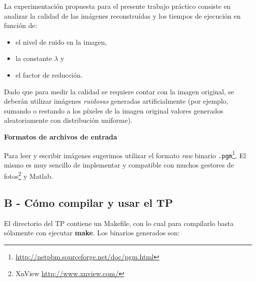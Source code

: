 \documentclass[a4paper]{article}
\begin{document}
La experimentaci\'on propuesta para el presente trabajo pr\'actico consiste en analizar la calidad de las im\'agenes reconstru\'idas y los tiempos de ejecuci\'on en funci\'on de: \\[-8mm]
	\begin{itemize}
		\item el nivel de ruido en la imagen, \\[-6mm]
		\item la constante $\lambda$ y\\[-6mm]
		\item el factor de reducci\'on. \\[-6mm]
	\end{itemize}	
	
Dado que para medir la calidad se requiere contar con la imagen original, se deber\'an utilizar im\'agenes \emph{ruidosas} generadas artificialmente (por ejemplo, sumando o restando a los p\'ixeles de la imagen original valores generados aleatoriamente con distribuci\'on uniforme).
	
{\bf Formatos de archivos de entrada}

Para leer y escribir im\'agenes sugerimos utilizar el formato {\em raw} binario \texttt{.pgm}\footnote{\url{http://netpbm.sourceforge.net/doc/pgm.html}}. 
El mismo es muy sencillo de implementar y compatible con muchos gestores de fotos\footnote{XnView \url{http://www.xnview.com/}} y Matlab.

\newpage

\subsection{B - Cómo compilar y usar el TP}
El directorio del TP contiene un Makefile, con lo cual para compilarlo basta sólamente con ejecutar \textbf{make}. Los binarios generados son: 
\end{document}
